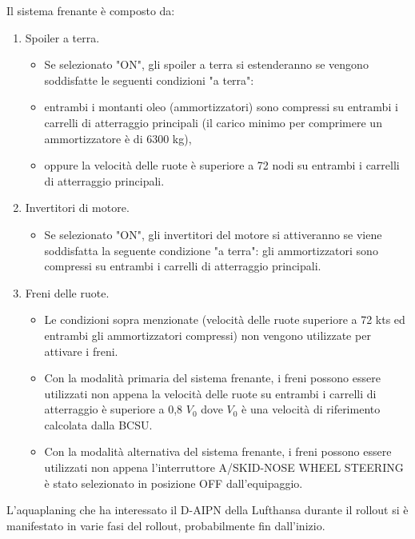 \documentclass[italian]{article}
\begin{document}
		Il sistema frenante è composto da:

		\begin{enumerate}
			\item  Spoiler a terra.

			\begin{itemize}
				\item Se selezionato "ON", gli spoiler a terra si estenderanno se vengono soddisfatte le seguenti condizioni "a terra":

				\item entrambi i montanti oleo (ammortizzatori) sono compressi su entrambi i carrelli di atterraggio principali (il carico minimo per comprimere un ammortizzatore è di 6300 kg),

				\item oppure la velocità delle ruote è superiore a 72 nodi su entrambi i carrelli di atterraggio principali.
			\end{itemize}

			\item  Invertitori di motore.

			\begin{itemize}
				\item Se selezionato "ON", gli invertitori del motore si attiveranno se viene soddisfatta la seguente condizione "a terra": gli ammortizzatori sono compressi su entrambi i carrelli di atterraggio principali.
			\end{itemize}

			\item  Freni delle ruote.
			\begin{itemize}

				\item Le condizioni sopra menzionate (velocità delle ruote superiore a 72 kts ed entrambi gli ammortizzatori compressi) non vengono utilizzate per attivare i freni.

				\item Con la modalità primaria del sistema frenante, i freni possono essere utilizzati non appena la velocità delle ruote su entrambi i carrelli di atterraggio è superiore a 0,8 $V_0$ dove $V_0$ è una velocità di riferimento calcolata dalla BCSU.

				\item Con la modalità alternativa del sistema frenante, i freni possono essere utilizzati non appena l'interruttore A/SKID-NOSE WHEEL STEERING è stato selezionato in posizione OFF dall'equipaggio.
			\end{itemize}
		\end{enumerate}
	L'aquaplaning che ha interessato il D-AIPN della Lufthansa durante il rollout si è manifestato in varie fasi del rollout, probabilmente fin dall'inizio.
\end{document}
